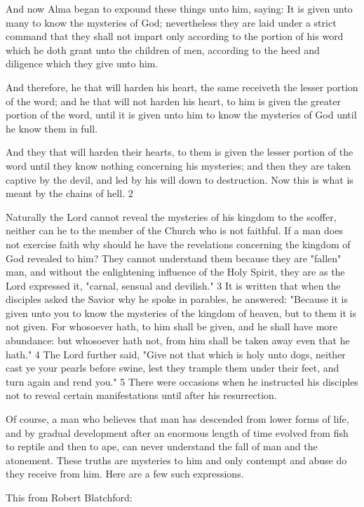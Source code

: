 And now Alma began to expound these things unto him, saying: It is given unto many to
know the mysteries of God; nevertheless they are laid under a strict command that they shall
not impart only according to the portion of his word which he doth grant unto the children of
men, according to the heed and diligence which they give unto him.

And therefore, he that will harden his heart, the same receiveth the lesser portion of the word;
and he that will not harden his heart, to him is given the greater portion of the word, until it is
given unto him to know the mysteries of God until he know them in full.

And they that will harden their hearts, to them is given the lesser portion of the word until
they know nothing concerning his mysteries; and then they are taken captive by the devil,
and led by his will down to destruction. Now this is what is meant by the chains of hell. 2

Naturally the Lord cannot reveal the mysteries of his kingdom to the scoffer, neither can he
to the member of the Church who is not faithful. If a man does not exercise faith why should
he have the revelations concerning the kingdom of God revealed to him? They cannot
understand them because they are "fallen" man, and without the enlightening influence of the
Holy Spirit, they are as the Lord expressed it, "carnal, sensual and devilish." 3 It is written
that when the disciples asked the Savior why he spoke in parables, he answered: "Because it
is given unto you to know the mysteries of the kingdom of heaven, but to them it is not
given. For whosoever hath, to him shall be given, and he shall have more abundance: but
whosoever hath not, from him shall be taken away even that he hath." 4 The Lord further
said, "Give not that which is holy unto dogs, neither cast ye your pearls before swine, lest
they trample them under their feet, and turn again and rend you." 5 There were occasions
when he instructed his disciples not to reveal certain manifestations until after his
resurrection.

Of course, a man who believes that man has descended from lower forms of life, and by
gradual development after an enormous length of time evolved from fish to reptile and then
to ape, can never understand the fall of man and the atonement. These truths are mysteries to
him and only contempt and abuse do they receive from him. Here are a few such expressions.

This from Robert Blatchford:

